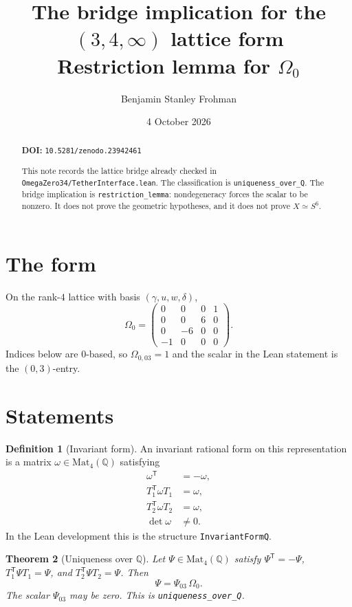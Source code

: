 \documentclass[11pt]{article}
\title{The bridge implication for the \((3,4,\infty)\) lattice form\\
\large Restriction lemma for \(\Omega_0\)}
\author{Benjamin Stanley Frohman}
\date{4 October 2026}
\newtheorem{theorem}{Theorem}
\theoremstyle{definition}
\newtheorem{definition}[theorem]{Definition}
\begin{document}
\maketitle

\begin{abstract}
\noindent\textbf{DOI:} \texttt{10.5281/zenodo.23942461}\par\smallskip

This note records the lattice bridge already checked in
\texttt{OmegaZero34/TetherInterface.lean}.
The classification is \texttt{uniqueness\_over\_Q}.
The bridge implication is \texttt{restriction\_lemma}:
nondegeneracy forces the scalar to be nonzero.
It does not prove the geometric hypotheses, and it does not prove \(X\simeq S^6\).
\end{abstract}

\section{The form}
On the rank-\(4\) lattice with basis \((\gamma,u,w,\delta)\),
\[
\Omega_0=
\begin{pmatrix}
0&0&0&1\\
0&0&6&0\\
0&-6&0&0\\
-1&0&0&0
\end{pmatrix}.
\]
Indices below are \(0\)-based, so \(\Omega_{0,03}=1\) and the scalar in the Lean statement is the \((0,3)\)-entry.

\section{Statements}

\begin{definition}[Invariant form]
An invariant rational form on this representation is a matrix
\(\omega\in\mathrm{Mat}_4(\mathbb{Q})\) satisfying
\begin{align*}
\omega^{\mathsf T}&=-\omega,\\
T_1^{\mathsf T}\omega T_1&=\omega,\\
T_2^{\mathsf T}\omega T_2&=\omega,\\
\det\omega&\neq 0.
\end{align*}
In the Lean development this is the structure \texttt{InvariantFormQ}.
\end{definition}

\begin{theorem}[Uniqueness over \(\mathbb{Q}\)]
Let \(\Psi\in\mathrm{Mat}_4(\mathbb{Q})\) satisfy
\(\Psi^{\mathsf T}=-\Psi\),
\(T_1^{\mathsf T}\Psi T_1=\Psi\), and
\(T_2^{\mathsf T}\Psi T_2=\Psi\).
Then
\[
\Psi=\Psi_{03}\,\Omega_0.
\]
The scalar \(\Psi_{03}\) may be zero.
This is \texttt{uniqueness\_over\_Q}.
\end{theorem}
\end{document}
